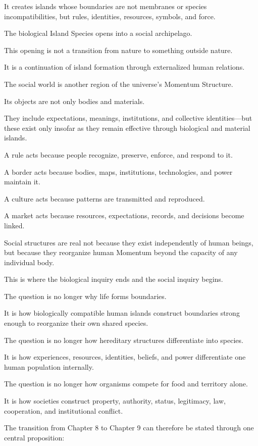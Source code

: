 It creates islands whose boundaries are not membranes or species incompatibilities, but rules, identities, resources, symbols, and force.

The biological Island Species opens into a social archipelago.

This opening is not a transition from nature to something outside nature.

It is a continuation of island formation through externalized human relations.

The social world is another region of the universe’s Momentum Structure.

Its objects are not only bodies and materials.

They include expectations, meanings, institutions, and collective identities—but these exist only insofar as they remain effective through biological and material islands.

A rule acts because people recognize, preserve, enforce, and respond to it.

A border acts because bodies, maps, institutions, technologies, and power maintain it.

A culture acts because patterns are transmitted and reproduced.

A market acts because resources, expectations, records, and decisions become linked.

Social structures are real not because they exist independently of human beings, but because they reorganize human Momentum beyond the capacity of any individual body.

This is where the biological inquiry ends and the social inquiry begins.

The question is no longer why life forms boundaries.

It is how biologically compatible human islands construct boundaries strong enough to reorganize their own shared species.

The question is no longer how hereditary structures differentiate into species.

It is how experiences, resources, identities, beliefs, and power differentiate one human population internally.

The question is no longer how organisms compete for food and territory alone.

It is how societies construct property, authority, status, legitimacy, law, cooperation, and institutional conflict.

The transition from Chapter 8 to Chapter 9 can therefore be stated through one central proposition:

